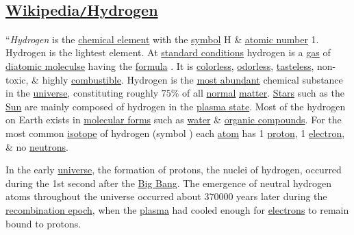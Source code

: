 \documentclass{article}
\begin{document}
\subsection{\href{https://en.wikipedia.org/wiki/Hydrogen}{Wikipedia\texttt{/}Hydrogen}}
``\textit{Hydrogen} is the \href{https://en.wikipedia.org/wiki/Chemical_element}{chemical element} with the \href{https://en.wikipedia.org/wiki/Symbol_(chemistry)}{symbol} H \& \href{https://en.wikipedia.org/wiki/Atomic_number}{atomic number} 1. Hydrogen is the lightest element. At \href{https://en.wikipedia.org/wiki/Standard_temperature_and_pressure}{standard conditions} hydrogen is a \href{https://en.wikipedia.org/wiki/Gas}{gas} of \href{https://en.wikipedia.org/wiki/Diatomic_molecule}{diatomic moleculse} having the \href{https://en.wikipedia.org/wiki/Chemical_formula}{formula} . It is \href{https://en.wikipedia.org/wiki/Transparency_(optics)}{colorless}, \href{https://en.wikipedia.org/wiki/Sense_of_smell}{odorless}, \href{https://en.wikipedia.org/wiki/Taste}{tasteless}, non-toxic, \& highly \href{https://en.wikipedia.org/wiki/Combustible}{combustible}. Hydrogen is the \href{https://en.wikipedia.org/wiki/Abundance_of_the_chemical_elements}{most abundant} chemical substance in the \href{https://en.wikipedia.org/wiki/Universe}{universe}, constituting roughly $75$\% of all \href{https://en.wikipedia.org/wiki/Baryon}{normal} \href{https://en.wikipedia.org/wiki/Matter}{matter}. \href{https://en.wikipedia.org/wiki/Star}{Stars} such as the \href{https://en.wikipedia.org/wiki/Sun}{Sun} are mainly composed of hydrogen in the \href{https://en.wikipedia.org/wiki/Plasma_state}{plasma state}. Most of the hydrogen on Earth exists in \href{https://en.wikipedia.org/wiki/Molecular_geometry}{molecular forms} such as \href{https://en.wikipedia.org/wiki/Water}{water} \& \href{https://en.wikipedia.org/wiki/Organic_compound}{organic compounds}. For the most common \href{https://en.wikipedia.org/wiki/Isotope}{isotope} of hydrogen (symbol ) each \href{https://en.wikipedia.org/wiki/Atom}{atom} has 1 \href{https://en.wikipedia.org/wiki/Proton}{proton}, 1 \href{https://en.wikipedia.org/wiki/Electron}{electron}, \& no \href{https://en.wikipedia.org/wiki/Neutron}{neutrons}.

In the early \href{https://en.wikipedia.org/wiki/Universe}{universe}, the formation of protons, the nuclei of hydrogen, occurred during the 1st second after the \href{https://en.wikipedia.org/wiki/Big_Bang}{Big Bang}. The emergence of neutral hydrogen atoms throughout the universe occurred about 370000 years later during the \href{https://en.wikipedia.org/wiki/Recombination_(cosmology)}{recombination epoch}, when the \href{https://en.wikipedia.org/wiki/Plasma_(physics)}{plasma} had cooled enough for \href{https://en.wikipedia.org/wiki/Electrons}{electrons} to remain bound to protons.
\end{document}
